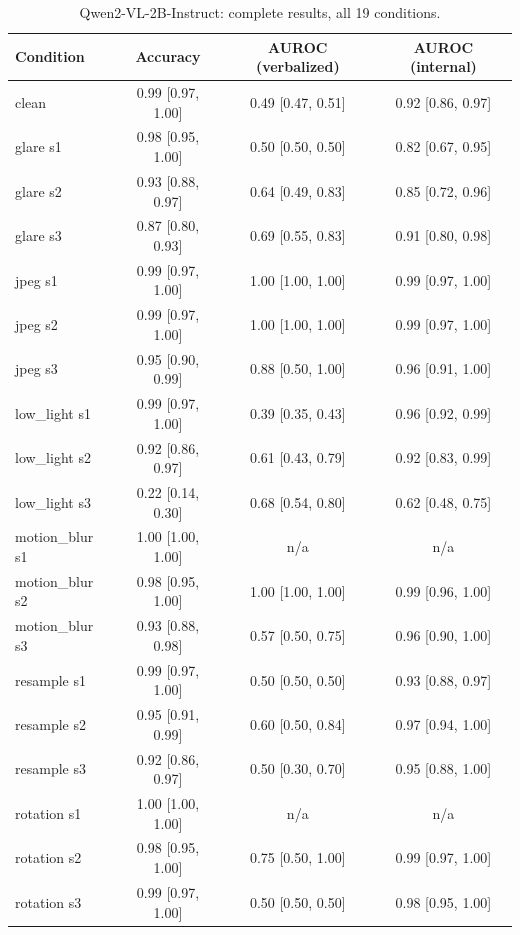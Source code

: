 \documentclass[11pt]{article}
\begin{document}
\begin{table}[h]
\centering
\small
\caption{Qwen2-VL-2B-Instruct: complete results, all 19 conditions.}
\label{tab:appendix-qwen}
\begin{tabular}{lccc}
\toprule
Condition & Accuracy & AUROC (verbalized) & AUROC (internal) \\
\midrule
clean            & 0.99 [0.97, 1.00] & 0.49 [0.47, 0.51] & 0.92 [0.86, 0.97] \\
glare s1         & 0.98 [0.95, 1.00] & 0.50 [0.50, 0.50] & 0.82 [0.67, 0.95] \\
glare s2         & 0.93 [0.88, 0.97] & 0.64 [0.49, 0.83] & 0.85 [0.72, 0.96] \\
glare s3         & 0.87 [0.80, 0.93] & 0.69 [0.55, 0.83] & 0.91 [0.80, 0.98] \\
jpeg s1          & 0.99 [0.97, 1.00] & 1.00 [1.00, 1.00] & 0.99 [0.97, 1.00] \\
jpeg s2          & 0.99 [0.97, 1.00] & 1.00 [1.00, 1.00] & 0.99 [0.97, 1.00] \\
jpeg s3          & 0.95 [0.90, 0.99] & 0.88 [0.50, 1.00] & 0.96 [0.91, 1.00] \\
low\_light s1    & 0.99 [0.97, 1.00] & 0.39 [0.35, 0.43] & 0.96 [0.92, 0.99] \\
low\_light s2    & 0.92 [0.86, 0.97] & 0.61 [0.43, 0.79] & 0.92 [0.83, 0.99] \\
low\_light s3    & 0.22 [0.14, 0.30] & 0.68 [0.54, 0.80] & 0.62 [0.48, 0.75] \\
motion\_blur s1  & 1.00 [1.00, 1.00] & n/a               & n/a               \\
motion\_blur s2  & 0.98 [0.95, 1.00] & 1.00 [1.00, 1.00] & 0.99 [0.96, 1.00] \\
motion\_blur s3  & 0.93 [0.88, 0.98] & 0.57 [0.50, 0.75] & 0.96 [0.90, 1.00] \\
resample s1      & 0.99 [0.97, 1.00] & 0.50 [0.50, 0.50] & 0.93 [0.88, 0.97] \\
resample s2      & 0.95 [0.91, 0.99] & 0.60 [0.50, 0.84] & 0.97 [0.94, 1.00] \\
resample s3      & 0.92 [0.86, 0.97] & 0.50 [0.30, 0.70] & 0.95 [0.88, 1.00] \\
rotation s1      & 1.00 [1.00, 1.00] & n/a               & n/a               \\
rotation s2      & 0.98 [0.95, 1.00] & 0.75 [0.50, 1.00] & 0.99 [0.97, 1.00] \\
rotation s3      & 0.99 [0.97, 1.00] & 0.50 [0.50, 0.50] & 0.98 [0.95, 1.00] \\
\bottomrule
\end{tabular}
\end{table}
\end{document}
